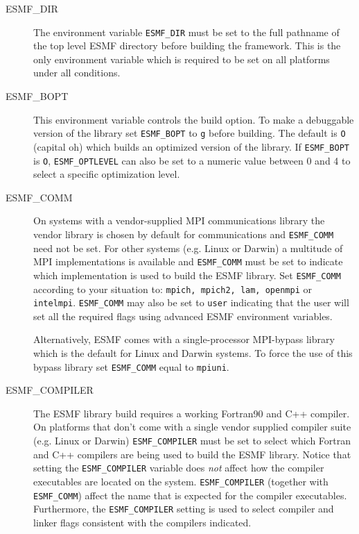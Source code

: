 \begin{description}

\item[ESMF\_DIR]
The environment variable {\tt ESMF\_DIR} must be set to the full pathname 
of the top level ESMF directory before building the framework.  This is the 
only environment variable which is required to be set on all platforms under 
all conditions.

\item[ESMF\_BOPT]
This environment variable controls the build option. To make a debuggable
version of the library set {\tt ESMF\_BOPT} to {\tt g} before building. The
default is {\tt O} (capital oh) which builds an optimized version of the 
library. If {\tt ESMF\_BOPT} is {\tt O}, {\tt ESMF\_OPTLEVEL} can also be set
to a numeric value between 0 and 4 to select a specific optimization level.

\item[ESMF\_COMM]
On systems with a vendor-supplied MPI communications library the vendor library 
is chosen by default for communications and {\tt ESMF\_COMM} need not be set.
For other systems (e.g. Linux or Darwin) a multitude of MPI implementations is
available and {\tt ESMF\_COMM} must be set to indicate which implementation is
used to build the ESMF library. Set {\tt ESMF\_COMM} according to your situation
to: {\tt mpich, mpich2, lam, openmpi} or {\tt intelmpi}. {\tt ESMF\_COMM} may
also be set to {\tt user} indicating that the user will set all the required
flags using advanced ESMF environment variables.

Alternatively, ESMF comes with a single-processor MPI-bypass library which is
the default for Linux and Darwin systems. To force the use of this bypass
library set {\tt ESMF\_COMM} equal to {\tt mpiuni}.

\item[ESMF\_COMPILER]
The ESMF library build requires a working Fortran90 and C++ compiler. On 
platforms that don't come with a single vendor supplied compiler suite
(e.g. Linux or Darwin) {\tt ESMF\_COMPILER} must be set to select which Fortran
and C++ compilers are being used to build the ESMF library. Notice that setting
the {\tt ESMF\_COMPILER} variable does {\em not} affect how the compiler
executables are located on the system. {\tt ESMF\_COMPILER} (together with
{\tt ESMF\_COMM}) affect the name that is expected for the compiler executables.
Furthermore, the {\tt ESMF\_COMPILER} setting is used to select compiler and
linker flags consistent with the compilers indicated.


\end{description}
